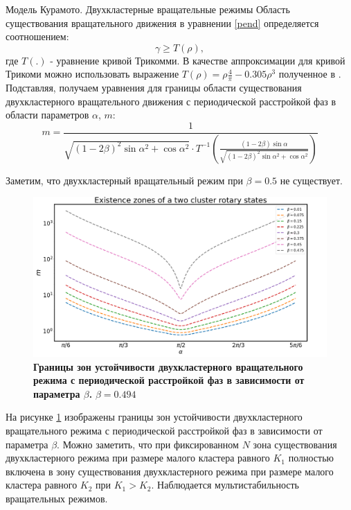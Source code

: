 \begin{chapter}{Модель Курамото. Двухкластерные вращательные режимы}
	Область существования вращательного движения в уравнении \ref{pend}
	определяется соотношением:
	\begin{equation}
		\gamma \ge T(\rho),
	\end{equation}
	где $T(.)$ - уравнение кривой Трикомми. В качестве аппроксимации для кривой Трикоми можно использовать выражение
	$T(\rho) = \rho\frac{4}{\pi} - 0.305\rho^3$ полученное в \cite{Belykh:Brister}.
	Подставляя, получаем уравнения для границы области существования двухкластерного вращательного движения с
	периодической расстройкой фаз в области параметров $\alpha$, $m$:
	\begin{equation} \label{borders}
		m = \frac{1}{\sqrt{(1 - 2\beta)^2\sin{\alpha}^2 + \cos{\alpha}^2} \cdot T^{-1}(\frac{(1 - 2\beta)\sin{\alpha}}{\sqrt{(1 - 2\beta)^2\sin{\alpha}^2 + \cos{\alpha}^2}})}
	\end{equation}

	Заметим, что двухкластерный вращательный режим при $\beta = 0.5$ не существует.

	\begin{figure}[h!]
		\begin{center}
			\includegraphics[width=1\columnwidth]{pictures/ex.png}
		\end{center}
		\caption{\textbf{Границы зон устойчивости двухкластерного вращательного режима с периодической расстройкой фаз в зависимости от параметра $\beta$.}
		$\beta = 0.494$}
		\label{ex-zones}
	\end{figure}

	На рисунке \ref{ex-zones} изображены границы зон устойчивости двухкластерного вращательного режима
	с периодической расстройкой фаз в зависимости от параметра $\beta$.
	Можно заметить, что при фиксированном $N$ зона существования двухкластерного режима при размере малого кластера равного $K_1$ полностью включена в 
	зону существования двухкластерного режима при размере малого кластера равного $K_2$ при $K_1 > K_2$. Наблюдается мультистабильность вращательных режимов.

\end{chapter}